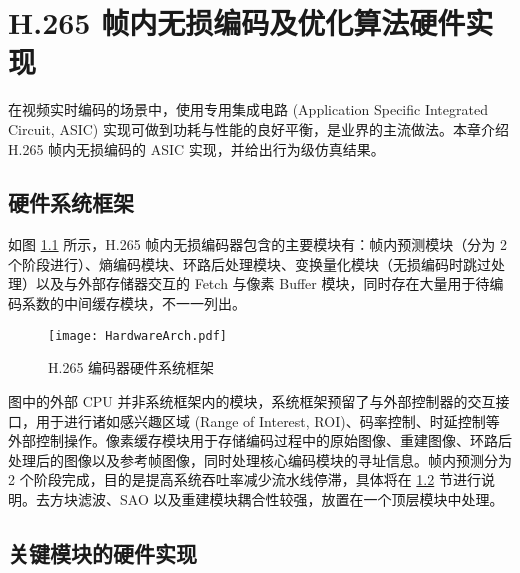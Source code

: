 \chapter{H.265 帧内无损编码及优化算法硬件实现}
\label{cha:c4}
在视频实时编码的场景中，使用专用集成电路 (Application Specific Integrated Circuit, ASIC) 实现可做到功耗与性能的良好平衡，是业界的主流做法。本章介绍 H.265 帧内无损编码的 ASIC 实现，并给出行为级仿真结果。

\section{硬件系统框架}
如图 \ref{fig:HardwareArch} 所示，H.265 帧内无损编码器包含的主要模块有：帧内预测模块（分为 2 个阶段进行）、熵编码模块、环路后处理模块、变换量化模块（无损编码时跳过处理）以及与外部存储器交互的 Fetch 与像素 Buffer 模块，同时存在大量用于待编码系数的中间缓存模块，不一一列出。
\begin{figure}[hbt]
    \centering
    \texttt{[image: HardwareArch.pdf]}
    \caption{H.265 编码器硬件系统框架}
    \label{fig:HardwareArch}
\end{figure}

图中的外部 CPU 并非系统框架内的模块，系统框架预留了与外部控制器的交互接口，用于进行诸如感兴趣区域 (Range of Interest, ROI)、码率控制、时延控制等外部控制操作。像素缓存模块用于存储编码过程中的原始图像、重建图像、环路后处理后的图像以及参考帧图像，同时处理核心编码模块的寻址信息。帧内预测分为 2 个阶段完成，目的是提高系统吞吐率减少流水线停滞，具体将在 \ref{cha:keymodule} 节进行说明。去方块滤波、SAO 以及重建模块耦合性较强，放置在一个顶层模块中处理。

\section{关键模块的硬件实现}
\label{cha:keymodule}

